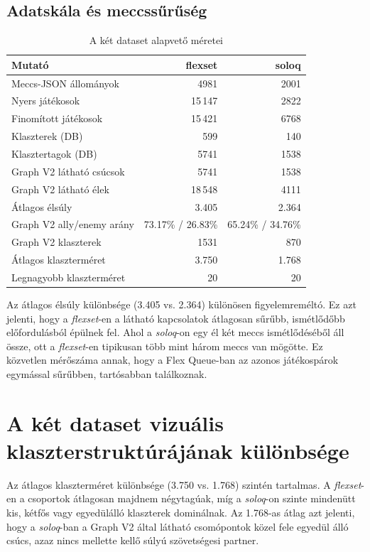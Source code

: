 \subsection{Adatskála és meccssűrűség}

\begin{table}[H]
\centering
\caption{A két dataset alapvető méretei}
\begin{tabularx}{\textwidth}{>{\raggedright\arraybackslash}p{5cm} rr}
\toprule
\textbf{Mutató} & \textbf{flexset} & \textbf{soloq} \\
\midrule
Meccs-JSON állományok & 4981 & 2001 \\
Nyers játékosok & 15\,147 & 2822 \\
Finomított játékosok & 15\,421 & 6768 \\
Klaszterek (DB) & 599 & 140 \\
Klasztertagok (DB) & 5741 & 1538 \\
Graph V2 látható csúcsok & 5741 & 1538 \\
Graph V2 látható élek & 18\,548 & 4111 \\
Átlagos élsúly & 3.405 & 2.364 \\
Graph V2 ally/enemy arány & 73.17\% / 26.83\% & 65.24\% / 34.76\% \\
Graph V2 klaszterek & 1531 & 870 \\
Átlagos klaszterméret & 3.750 & 1.768 \\
Legnagyobb klaszterméret & 20 & 20 \\
\bottomrule
\end{tabularx}
\end{table}

Az átlagos élsúly különbsége (3.405 vs. 2.364) különösen figyelemreméltó. Ez azt jelenti, hogy a \textit{flexset}-en a látható kapcsolatok átlagosan sűrűbb, ismétlődőbb előfordulásból épülnek fel. Ahol a \textit{soloq}-on egy él két meccs ismétlődéséből áll össze, ott a \textit{flexset}-en tipikusan több mint három meccs van mögötte. Ez közvetlen mérőszáma annak, hogy a Flex Queue-ban az azonos játékospárok egymással sűrűbben, tartósabban találkoznak.

\section{A két dataset vizuális klaszterstruktúrájának különbsége}

Az átlagos klaszterméret különbsége (3.750 vs. 1.768) szintén tartalmas. A \textit{flexset}-en a csoportok átlagosan majdnem négytagúak, míg a \textit{soloq}-on szinte mindenütt kis, kétfős vagy egyedülálló klaszterek dominálnak. Az 1.768-as átlag azt jelenti, hogy a \textit{soloq}-ban a Graph V2 által látható csomópontok közel fele egyedül álló csúcs, azaz nincs mellette kellő súlyú szövetségesi partner.

